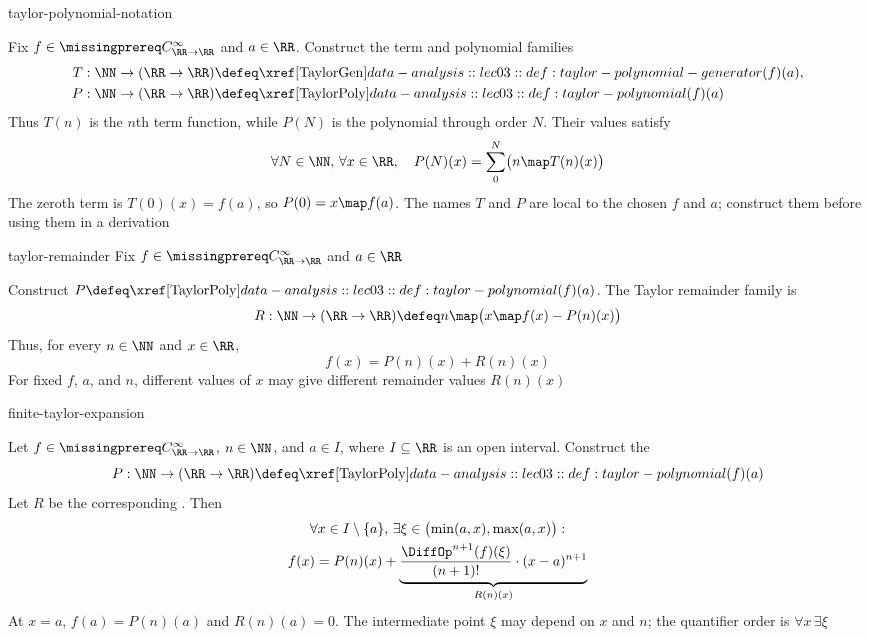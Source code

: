 \documentclass[12pt]{article}
\numberwithin{figure}{section}
\begin{document}
\begin{conv}{taylor-polynomial-notation}
  \leavevmode\par
  \begingroup\color{notesmissingprereq}
  \par\smallskip
  Fix $f\in\SmoothRealFunctions$ and $a\in\RR$. Construct the term and
  polynomial families
  \[
    \begin{aligned}
      T &: \NN\to(\RR\to\RR)\defeq\TaylorGen(f)(a),\\
      P &: \NN\to(\RR\to\RR)\defeq\TaylorPoly(f)(a)
    \end{aligned}
  \]
  Thus $T(n)$ is the $n$th term function, while $P(N)$ is the polynomial
  through order $N$. Their values satisfy
  \[
    \forall N\in\NN,\,\forall x\in\RR,\quad
    P(N)(x)=\sum_0^N\bigl(n\map T(n)(x)\bigr)
  \]
  The zeroth term is $T(0)(x)=f(a)$, so $P(0)=x\map f(a)$.
  The names $T$ and $P$ are local to
  the chosen $f$ and $a$; construct them before using them in a derivation
  \par\endgroup
\end{conv}

\begin{dfn}{taylor-remainder}
  Fix $f\in\SmoothRealFunctions$ and $a\in\RR$

  Construct $P\defeq\TaylorPoly(f)(a)$. The Taylor remainder family is
  \[
    R:\NN\to(\RR\to\RR)
      \defeq n\map\bigl(x\map f(x)-P(n)(x)\bigr)
  \]
  Thus, for every $n\in\NN$ and $x\in\RR$,
  \[
    f(x)=P(n)(x)+R(n)(x)
  \]
  For fixed $f$, $a$, and $n$, different values of $x$ may give different
  remainder values $R(n)(x)$
\end{dfn}

\begin{thm}{finite-taylor-expansion}
  \leavevmode\par
  \begingroup\color{notesmissingprereq}
  \par\smallskip
  Let $f\in\SmoothRealFunctions$, $n\in\NN$, and $a\in I$, where
  $I\subseteq\RR$ is an open interval. Construct the
  \[
    P:\NN\to(\RR\to\RR)\defeq\TaylorPoly(f)(a)
  \]
  Let $R$ be the corresponding
  . Then
  \[
    \begin{gathered}
      \forall x\in I\setminus\{a\},\,
      \exists\xi\in\bigl(\min(a,x),\max(a,x)\bigr):\\
      f(x)=P(n)(x)+\underbrace{
        \frac{\DiffOp^{n+1}(f)(\xi)}{(n+1)!}\cdot(x-a)^{n+1}
      }_{R(n)(x)}
    \end{gathered}
  \]
  At $x=a$, $f(a)=P(n)(a)$ and $R(n)(a)=0$.
  The intermediate point $\xi$ may depend on $x$ and $n$; the quantifier
  order is $\forall x\,\exists\xi$
  \par\endgroup
\end{thm}
\end{document}
